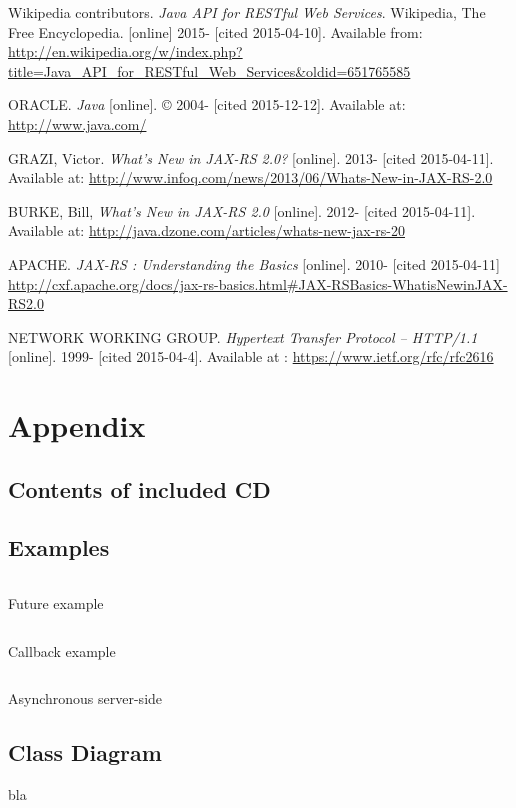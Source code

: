 \documentclass[12pt,final,oneside]{fithesis2}
\begin{document}
\begin{thebibliography}{}
Wikipedia contributors. \textit{Java API for RESTful Web Services}. Wikipedia, The Free Encyclopedia. [online] 2015- [cited 2015-04-10]. Available from: \url{http://en.wikipedia.org/w/index.php?title=Java_API_for_RESTful_Web_Services&oldid=651765585} 


 ORACLE. \textit{Java} [online]. \copyright{} 2004- [cited 2015-12-12]. Available at: \url{http://www.java.com/}		

 GRAZI, Victor. \textit{What's New in JAX-RS 2.0?} [online]. 2013- [cited 2015-04-11]. Available at: \url{http://www.infoq.com/news/2013/06/Whats-New-in-JAX-RS-2.0}

 BURKE, Bill, \textit{What's New in JAX-RS 2.0} [online]. 2012- [cited 2015-04-11]. Available at: \url{http://java.dzone.com/articles/whats-new-jax-rs-20} 	

 APACHE. \textit{JAX-RS : Understanding the Basics} [online]. 2010- [cited 2015-04-11] \url{http://cxf.apache.org/docs/jax-rs-basics.html\#JAX-RSBasics-WhatisNewinJAX-RS2.0}

 NETWORK WORKING GROUP. \textit{Hypertext Transfer Protocol -- HTTP/1.1
} [online]. 1999- [cited 2015-04-4]. Available at : \url{https://www.ietf.org/rfc/rfc2616}

%

%
%




\end{thebibliography}

\endgroup
\appendix

\chapter{Appendix}

\section{Contents of included CD}
\newpage
\section{Examples}
\begin{listing}[ht]
	\inputminted[]{java}{sources/future.java}
	\caption{Future example}
	\label{future}
\end{listing}
\begin{listing}[ht]
	\inputminted[]{java}{sources/callbackClient.java}
	\caption{Callback example}
	\label{callbackClient}
\end{listing}

\begin{listing}[ht]
	\inputminted[]{java}{sources/todo.java}
	\caption{Asynchronous server-side}
	\label{async-server}
\end{listing}
\newpage
\section{Class Diagram}
bla
\end{document}
